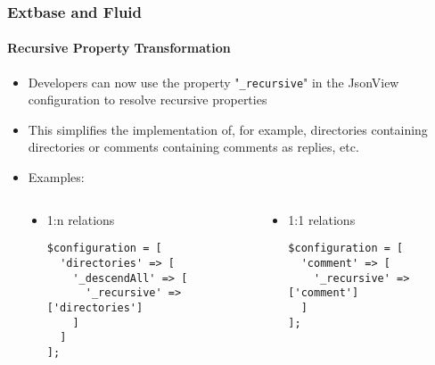 %

\begin{frame}[fragile]
	\frametitle{Extbase and Fluid}
	\framesubtitle{Recursive Property Transformation}


	\begin{itemize}
		\item Developers can now use the property "\texttt{\_recursive}" in the
			JsonView configuration to resolve recursive properties
		\item This simplifies the implementation of, for example, directories
			containing directories or comments containing comments as replies, etc.
		\item Examples:
	\end{itemize}

	\begin{columns}[T]
		\begin{column}{.03\textwidth}
		\end{column}
		\begin{column}{.485\textwidth}
			\begin{itemize}\small
				\item 1:n relations
\begin{lstlisting}
$configuration = [
  'directories' => [
    '_descendAll' => [
      '_recursive' => ['directories']
    ]
  ]
];
\end{lstlisting}
			\end{itemize}\normalsize
		\end{column}
		\begin{column}{.485\textwidth}
			\begin{itemize}\small
				\item 1:1 relations
\begin{lstlisting}
$configuration = [
  'comment' => [
    '_recursive' => ['comment']
  ]
];
\end{lstlisting}
			\end{itemize}\normalsize
		\end{column}
	\end{columns}

\end{frame}

